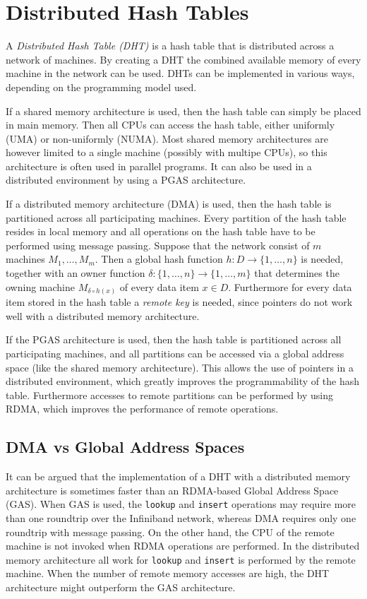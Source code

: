 \section{Distributed Hash Tables}
A \emph{Distributed Hash Table (DHT)} is a hash table that is distributed across a network of machines. By creating a DHT the combined available memory of every machine in the network can be used. DHTs can be implemented in various ways, depending on the programming model used.

If a shared memory architecture is used, then the hash table can simply be placed in main memory. Then all CPUs can access the hash table, either uniformly (UMA) or non-uniformly (NUMA). Most shared memory architectures are however limited to a single machine (possibly with multipe CPUs), so this architecture is often used in parallel programs. It can also be used in a distributed environment by using a PGAS architecture. 

If a distributed memory architecture (DMA) is used, then the hash table is partitioned across all participating machines. Every partition of the hash table resides in local memory and all operations on the hash table have to be performed using message passing. Suppose that the network consist of $m$ machines $M_1, \dots, M_m$. Then a global hash function $h : D \rightarrow \{ 1, \dots, n \}$ is needed, together with an owner function $\delta : \{ 1, \dots, n \} \rightarrow \{ 1, \dots, m \}$ that determines the owning machine $M_{\delta \circ h(x)}$ of every data item $x \in D$. Furthermore for every data item stored in the hash table a \emph{remote key} is needed, since pointers do not work well with a distributed memory architecture.

If the PGAS architecture is used, then the hash table is partitioned across all participating machines, and all partitions can be accessed via a global address space (like the shared memory architecture). This allows the use of pointers in a distributed environment, which greatly improves the programmability of the hash table. Furthermore accesses to remote partitions can be performed by using RDMA, which improves the performance of remote operations. 

\subsection{DMA vs Global Address Spaces}
It can be argued that the implementation of a DHT with a distributed memory architecture is sometimes faster than an RDMA-based Global Address Space (GAS). When GAS is used, the \texttt{lookup} and \texttt{insert} operations may require more than one roundtrip over the Infiniband network, whereas DMA requires only one roundtrip with message passing. On the other hand, the CPU of the remote machine is not invoked when RDMA operations are performed. In the distributed memory architecture all work for \texttt{lookup} and \texttt{insert} is performed by the remote machine. When the number of remote memory accesses are high, the DHT architecture might outperform the GAS architecture.


